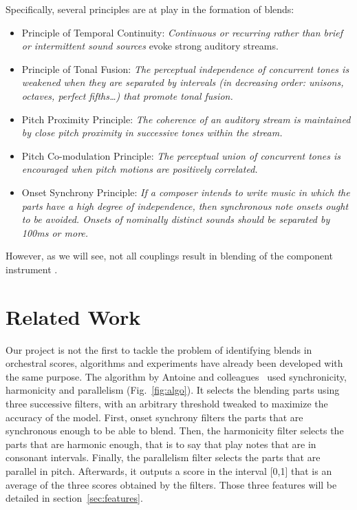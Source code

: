 \documentclass{article}
\begin{document}
Specifically, several principles are at play in the formation of blends:\cite{cambouropoulos, mcadams_taxonomy_2022}
\begin{itemize}
  \item Principle of Temporal Continuity: \textit{Continuous or recurring rather than brief or intermittent sound sources} evoke strong auditory streams.
  \item Principle of Tonal Fusion: \textit{The perceptual independence of concurrent tones is weakened when they are separated by intervals (in decreasing order: unisons, octaves, perfect fifths…) that promote tonal fusion.}
  \item Pitch Proximity Principle: \textit{The coherence of an auditory stream is maintained by close pitch proximity in successive tones within the stream.}
  \item Pitch Co-modulation Principle: \textit{The perceptual union of concurrent tones is encouraged when pitch motions are positively correlated.}
  \item Onset Synchrony Principle: \textit{If a composer intends to write music in which the parts have a high degree of independence, then synchronous note onsets ought to be avoided. Onsets of nominally distinct sounds should be separated by 100ms or more.}
\end{itemize}
However, as we will see, not all couplings result in blending of the component instrument \cite{mcadams_taxonomy_2022}.


\section{Related Work}\label{sec:related_work}

Our project is not the first to tackle the problem of identifying blends in orchestral scores, algorithms and experiments have already been developed with the same purpose.
The algorithm by Antoine and colleagues~\cite{antoine_blends} used synchronicity, harmonicity and parallelism (Fig.~\ref{fig:algo}).
It selects the blending parts using three successive filters, with an arbitrary threshold tweaked to maximize the accuracy of the model.
First, onset synchrony filters the parts that are synchronous enough to be able to blend.
Then, the harmonicity filter selects the parts that are harmonic enough, that is to say that play notes that are in consonant intervals.
Finally, the parallelism filter selects the parts that are parallel in pitch.
Afterwards, it outputs a score in the interval [0,1] that is an average of the three scores obtained by the filters.
Those three features will be detailed in section~\ref{sec:features}.
\end{document}
